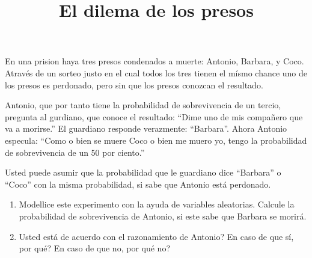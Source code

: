\documentclass[notitlepage]{article}
\theoremstyle{definition}
\theoremstyle{remark}
\begin{document}
	\title{\textbf{El dilema de los presos}}
	
	En una prision haya tres presos condenados a muerte: Antonio, Barbara, y Coco. Através de un sorteo justo en el cual todos los tres tienen el mísmo chance uno de los presos es perdonado, pero sin que los presos conozcan el resultado.
	
	Antonio, que por tanto tiene la probabilidad de sobrevivencia de un tercio, pregunta al gurdiano, que conoce el resultado: ``Dime uno de mis compañero que va a morirse.'' El guardiano responde verazmente: ``Barbara''. Ahora Antonio especula: ``Como o bien se muere Coco o bien me muero yo, tengo la probabilidad de sobrevivencia de un 50 por ciento.''
	
	Usted puede asumir que la probabilidad que le guardiano dice ``Barbara'' o ``Coco'' con la misma probabilidad, si sabe que Antonio está perdonado.
	
	\begin{enumerate}[1)]
		\item Modellice este experimento con la ayuda de variables aleatorias. Calcule la probabilidad de sobrevivencia de Antonio, si este sabe que Barbara se morirá.
		\item Usted está de acuerdo con el razonamiento de Antonio? En caso de que sí, por qué? En caso de que no, por qué no?
	\end{enumerate}
	
\end{document}
